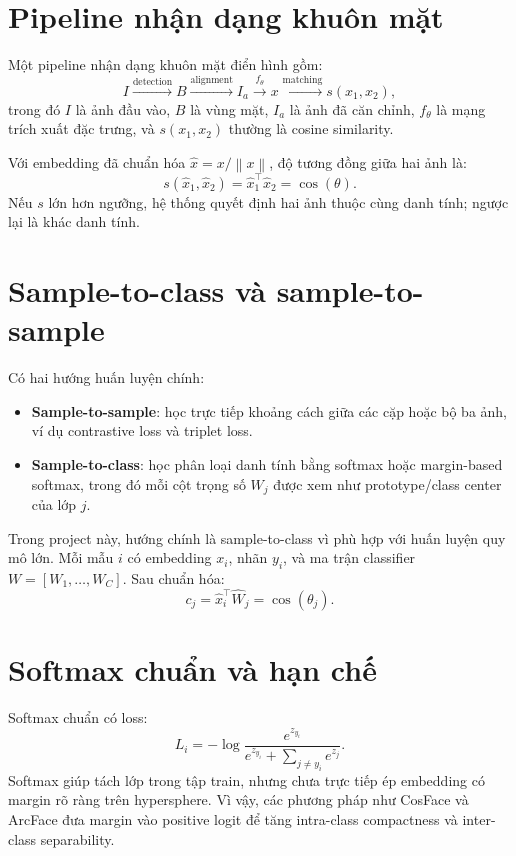 \documentclass[13pt,a4paper]{extreport}
\newcommand{\norm}[1]{\left\lVert #1 \right\rVert}
\begin{document}
\section{Pipeline nhận dạng khuôn mặt}
Một pipeline nhận dạng khuôn mặt điển hình gồm:
\begin{equation}
    I \xrightarrow{\text{detection}} B \xrightarrow{\text{alignment}} I_a \xrightarrow{f_\theta} x \xrightarrow{\text{matching}} s(x_1,x_2),
\end{equation}
trong đó $I$ là ảnh đầu vào, $B$ là vùng mặt, $I_a$ là ảnh đã căn chỉnh, $f_\theta$ là mạng trích xuất đặc trưng, và $s(x_1,x_2)$ thường là cosine similarity.

Với embedding đã chuẩn hóa $\hat{x}=x/\norm{x}$, độ tương đồng giữa hai ảnh là:
\begin{equation}
    s(\hat{x}_1,\hat{x}_2)=\hat{x}_1^\top \hat{x}_2 = \cos(\theta).
\end{equation}
Nếu $s$ lớn hơn ngưỡng, hệ thống quyết định hai ảnh thuộc cùng danh tính; ngược lại là khác danh tính.

\section{Sample-to-class và sample-to-sample}
Có hai hướng huấn luyện chính:
\begin{itemize}[leftmargin=1.2cm]
    \item \textbf{Sample-to-sample}: học trực tiếp khoảng cách giữa các cặp hoặc bộ ba ảnh, ví dụ contrastive loss và triplet loss.
    \item \textbf{Sample-to-class}: học phân loại danh tính bằng softmax hoặc margin-based softmax, trong đó mỗi cột trọng số $W_j$ được xem như prototype/class center của lớp $j$.
\end{itemize}

Trong project này, hướng chính là sample-to-class vì phù hợp với huấn luyện quy mô lớn. Mỗi mẫu $i$ có embedding $x_i$, nhãn $y_i$, và ma trận classifier $W=[W_1,\ldots,W_C]$. Sau chuẩn hóa:
\begin{equation}
    c_j = \hat{x}_i^\top \hat{W}_j = \cos(\theta_j).
\end{equation}

\section{Softmax chuẩn và hạn chế}
Softmax chuẩn có loss:
\begin{equation}
    L_i = -\log \frac{e^{z_{y_i}}}{e^{z_{y_i}} + \sum_{j\ne y_i} e^{z_j}}.
\end{equation}
Softmax giúp tách lớp trong tập train, nhưng chưa trực tiếp ép embedding có margin rõ ràng trên hypersphere. Vì vậy, các phương pháp như CosFace và ArcFace đưa margin vào positive logit để tăng intra-class compactness và inter-class separability.
\end{document}
